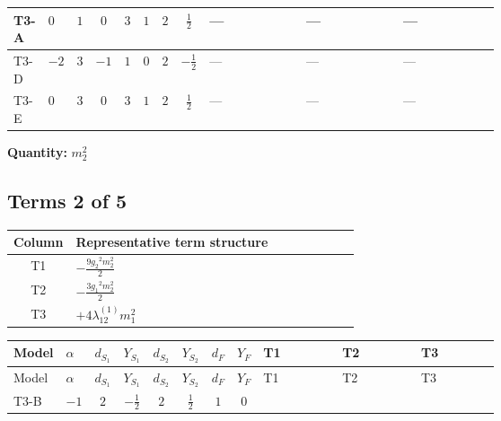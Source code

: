 \documentclass[8pt]{article}
\begin{document}
\begin{landscape}
\begin{longtable}{@{}llcccccc >{\raggedright\arraybackslash}p{0.21\linewidth} >{\raggedright\arraybackslash}p{0.21\linewidth} >{\raggedright\arraybackslash}p{0.21\linewidth}@{}}
\midrule
T3-A & $0$ & $1$ & $0$ & $3$ & $1$ & $2$ & $\frac{1}{2}$ & --- & --- & --- \\
\midrule
T3-D & $-2$ & $3$ & $-1$ & $1$ & $0$ & $2$ & $-\frac{1}{2}$ & --- & --- & --- \\
\midrule
T3-E & $0$ & $3$ & $0$ & $3$ & $1$ & $2$ & $\frac{1}{2}$ & --- & --- & --- \\
\midrule
\bottomrule
\end{longtable}
\clearpage
\noindent\textbf{Quantity: }$m_2^2$\par\smallskip
\subsection*{Terms 2 of 5}
\begin{center}
\begin{tabular}{@{}c >{\raggedright\arraybackslash}p{0.82\linewidth}@{}}
\toprule
Column & Representative term structure \\
\midrule
T1 & \(\displaystyle -\frac{9 {g_2}^2 {m_2^2}}{2}\) \\
\midrule
T2 & \(\displaystyle -\frac{3 {g_1}^2 {m_2^2}}{2}\) \\
\midrule
T3 & \(\displaystyle +4 {\lambda_{12}^{(1)}} {m_1^2}\) \\
\midrule
\bottomrule
\end{tabular}
\end{center}
\smallskip
\tiny
\begin{longtable}{@{}llcccccc >{\raggedright\arraybackslash}p{0.21\linewidth} >{\raggedright\arraybackslash}p{0.21\linewidth} >{\raggedright\arraybackslash}p{0.21\linewidth}@{}}
\toprule
Model & $\alpha$ & $d_{S_1}$ & $Y_{S_1}$ & $d_{S_2}$ & $Y_{S_2}$ & $d_F$ & $Y_F$ & T1 & T2 & T3 \\
\midrule
\endfirsthead
\toprule
Model & $\alpha$ & $d_{S_1}$ & $Y_{S_1}$ & $d_{S_2}$ & $Y_{S_2}$ & $d_F$ & $Y_F$ & T1 & T2 & T3 \\
\midrule
\endhead
T3-B & $-1$ & $2$ & $-\frac{1}{2}$ & $2$ & $\frac{1}{2}$ & $1$ & $0$ & \scriptsize\adjustbox{max width=\linewidth}{$\begin{gathered} -\frac{9 {g_2}^2 {m_2^2}}{2}\end{gathered}$} & \scriptsize\adjustbox{max width=\linewidth}{$\begin{gathered} -\frac{3 {g_1}^2 {m_2^2}}{2}\end{gathered}$} & \scriptsize\adjustbox{max width=\linewidth}{$\begin{gathered} +4 {\lambda_{12}^{(1)}} {m_1^2}\end{gathered}$} \\

\end{longtable}
\end{landscape}
\end{document}

